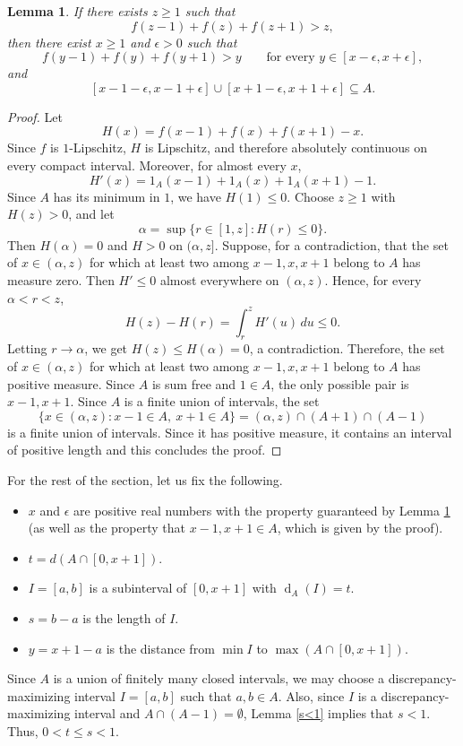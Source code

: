 \documentclass[11pt,reqno]{amsart}
\newtheorem{lem}[thm]{Lemma}
\theoremstyle{definition}
\DeclareMathOperator{\disc}{d}
\def\e{\epsilon}
\def\F#1{f(#1)}
\begin{document}
\begin{lem}\label{positive-triple-reduction} If there exists $z\geq 1$ such that 
$$ 
\F{z-1}+\F{z}+\F{z+1}>z, 
$$
then there exist $x\geq 1$ and $\epsilon>0$ such that
$$ 
\F{y-1}+\F{y}+\F{y+1}>y \qquad\text{for every } y\in[x-\epsilon,x+\epsilon], 
$$ 
and 
$$ 
[x-1-\epsilon,x-1+\epsilon]\cup[x+1-\epsilon,x+1+\epsilon]\subseteq A. 
$$ 
\end{lem}
\begin{proof}
     Let
    $$
        H(x)=\F{x-1}+\F{x}+\F{x+1}-x.
    $$
    Since $f$ is $1$-Lipschitz, $H$ is Lipschitz, and therefore absolutely continuous on every compact interval. Moreover, for almost every $x$,
    $$
        H'(x)=1_A(x-1)+1_A(x)+1_A(x+1)-1.
    $$
    Since $A$ has its minimum in $1$, we have $H(1)\leq 0$.
    Choose $z\geq 1$ with $H(z)>0$, and let
    $$
        \alpha=\sup\{r\in[1,z]:H(r)\leq 0\}.
    $$
    Then $H(\alpha)=0$ and $H>0$ on $(\alpha,z]$.
    Suppose, for a contradiction, that the set of $x\in(\alpha,z)$ for which at least two among $x-1,x,x+1$ belong to $A$ has measure zero. Then $H'\leq 0$ almost everywhere on $(\alpha,z)$. Hence, for every $\alpha<r<z$,
    $$
        H(z)-H(r)=\int_r^z H'(u)\,du\leq 0.
    $$
    Letting $r\to \alpha$, we get $H(z)\leq H(\alpha)=0$, a contradiction.
    Therefore,   the set of $x\in(\alpha,z)$ for which at least two among $x-1,x,x+1$ belong to $A$ has positive measure. Since $A$ is sum free and $1\in A$, the only possible pair is $x-1,x+1$.
    Since $A$ is a finite union of intervals, the set
$$
    \{x\in(\alpha,z):x-1\in A,\ x+1\in A\}
    =
    (\alpha,z)\cap(A+1)\cap(A-1)
$$
is a finite union of intervals. Since it has positive measure, it contains an interval of positive length and this concludes the proof.
\end{proof}

For the rest of the section, let us fix the following.
\begin{itemize}
\item $x$ and $\e$ are positive real numbers with the property guaranteed by Lemma \ref{positive-triple-reduction} (as well as the property that $x-1, x+1\in A$, which is given by the proof). 
\item $t=d(A\cap[0,x+1])$.
\item $I=[a,b]$ is a subinterval of $[0,x+1]$ with $\disc_A(I)=t$.
\item $s=b-a$ is the length of $I$.
\item $y=x+1-a$ is the distance from $\min I$ to $\max(A\cap[0,x+1])$.
\end{itemize}
Since $A$ is a union of finitely many closed intervals, we may choose a discrepancy-maximizing interval $I=[a,b]$ such that $a,b\in A$. Also, since $I$ is a discrepancy-maximizing interval and $A\cap(A-1)=\emptyset$, Lemma \ref{s<1} implies that $s<1$. Thus, $0<t\leq s<1$. 
\end{document}
